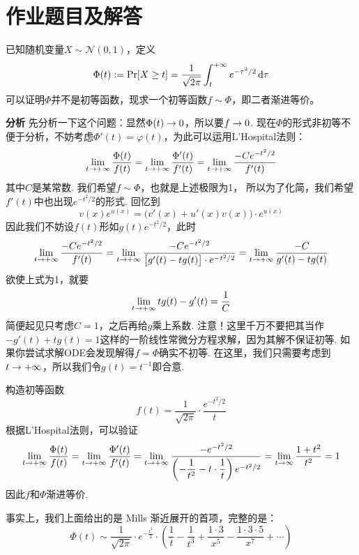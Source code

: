 \chapter{作业题目及解答} \label{chap:homework}


\begin{exercise} 
已知随机变量$X \sim \mathcal{N}(0, 1)$，定义 
\[
\Phi(t) := \Pr[X \ge t] = \dfrac{1}{\sqrt{2\pi}}\int_{t}^{+\infty} e^{-\tau^2/2} \dx[\tau]
\]
可以证明$\Phi$并不是初等函数，现求一个初等函数$f \sim \Phi$，即二者渐进等价。
\end{exercise}

\textbf{分析} \quad 先分析一下这个问题：显然$\Phi(t) \ra 0$，所以要$f \ra 0$. 现在$\Phi$的形式非初等不便于分析，不妨考虑$\Phi'(t) = \varphi(t)$，为此可以运用L'Hospital法则：
\[
\lim_{t \ra +\infty} \dfrac{\Phi(t)}{f(t)} = \lim_{t \ra +\infty} \dfrac{\Phi'(t)}{f'(t)} = \lim_{t \ra +\infty} \dfrac{-C e^{-t^2/2}}{f'(t)}
\]
其中$C$是某常数. 我们希望$f \sim \Phi$，也就是上述极限为1， 所以为了化简，我们希望$f'(t)$中也出现$e^{-t^2/2}$的形式. 回忆到 
\[
v(x)e^{u(x)} = \Big(v'(x) + u'(x)v(x) \Big) \cdot e^{u(x)}
\]
因此我们不妨设$f(t)$形如$g(t) e^{-t^2/2}$，此时
\[
\lim_{t \ra +\infty} \dfrac{-C e^{-t^2/2}}{f'(t)}
= \lim_{t \ra +\infty} \dfrac{-C e^{-t^2/2}}{\big[g'(t) - tg(t)\big] \cdot e^{-t^2/2}} = \lim_{t \ra +\infty}\dfrac{-C}{g'(t) - tg(t)}
\]
欲使上式为1，就要
\[
\lim_{t\ra +\infty}  tg(t) - g'(t) = \dfrac{1}{C}
\]
简便起见只考虑$C=1$，之后再给$g$乘上系数. 注意！这里千万不要把其当作$-g'(t) + tg(t) = 1$这样的一阶线性常微分方程求解，因为其解不保证初等. 如果你尝试求解ODE会发现解得$f = \Phi$确实不初等. 在这里，我们只需要考虑到$t \ra +\infty$，所以我们令$g(t) = t^{-1}$即合意.

\begin{solution}
构造初等函数 
\[
f(t) = \dfrac{1}{\sqrt{2\pi}} \cdot \dfrac{e^{-t^2/2}}{t}
\]
根据L'Hospital法则，可以验证
\[
\lim_{t\ra +\infty} \dfrac{\Phi(t)}{f(t)} = \lim_{t \ra +\infty} \dfrac{\Phi'(t)}{f'(t)} = \lim_{t \ra +\infty} \dfrac{-e^{-t^2/2}}{\left(-\dfrac{1}{t^2} - t\cdot \dfrac{1}{t}\right) e^{-t^2/2}} = \lim_{t\ra \infty}\dfrac{1+t^2}{t^2} = 1
\]
因此$f$和$\Phi$渐进等价. 
\end{solution}

事实上，我们上面给出的是 Mills 渐近展开的首项，完整的是：
\[
\Phi(t) \sim \dfrac{1}{\sqrt{2\pi}} \cdot {e^{-\frac{t^2}{2}}}
\cdot \left(
    \dfrac{1}{t} - \dfrac{1}{t^3} + \dfrac{1 \cdot 3}{x^5} - \dfrac{1 \cdot 3 \cdot 5}{x^7} + \cdots
\right)
\]

